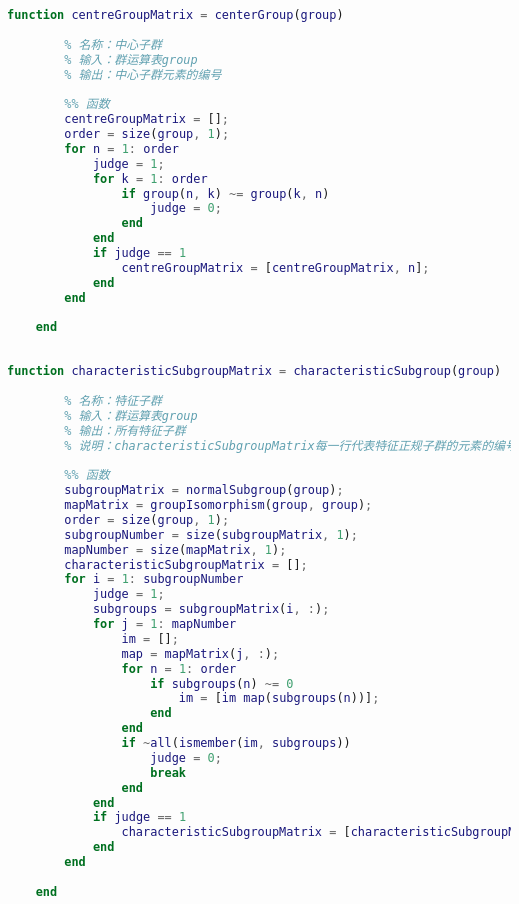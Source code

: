 \begin{lstlisting}[language=Matlab, caption={中心子群}, label={centerGroup}]
	function centreGroupMatrix = centerGroup(group)
	
	    % 名称：中心子群
	    % 输入：群运算表group
	    % 输出：中心子群元素的编号
	
	    %% 函数
	    centreGroupMatrix = [];
	    order = size(group, 1);
	    for n = 1: order
	        judge = 1;
	        for k = 1: order
	            if group(n, k) ~= group(k, n)
	                judge = 0;
	            end
	        end
	        if judge == 1
	            centreGroupMatrix = [centreGroupMatrix, n];
	        end
	    end
	
	end
	
\end{lstlisting}

\begin{lstlisting}[language=Matlab, caption={特征子群}, label={characteristicSubgroup}]
	function characteristicSubgroupMatrix = characteristicSubgroup(group)
	
	    % 名称：特征子群
	    % 输入：群运算表group
	    % 输出：所有特征子群
	    % 说明：characteristicSubgroupMatrix每一行代表特征正规子群的元素的编号
	
	    %% 函数
	    subgroupMatrix = normalSubgroup(group);
	    mapMatrix = groupIsomorphism(group, group);
	    order = size(group, 1);
	    subgroupNumber = size(subgroupMatrix, 1);
	    mapNumber = size(mapMatrix, 1);
	    characteristicSubgroupMatrix = [];
	    for i = 1: subgroupNumber
	        judge = 1;
	        subgroups = subgroupMatrix(i, :);
	        for j = 1: mapNumber
	            im = [];
	            map = mapMatrix(j, :);
	            for n = 1: order
	                if subgroups(n) ~= 0
	                    im = [im map(subgroups(n))];
	                end
	            end
	            if ~all(ismember(im, subgroups))
	                judge = 0;
	                break
	            end
	        end
	        if judge == 1
	            characteristicSubgroupMatrix = [characteristicSubgroupMatrix; subgroups];
	        end
	    end
	
	end
	
\end{lstlisting}

